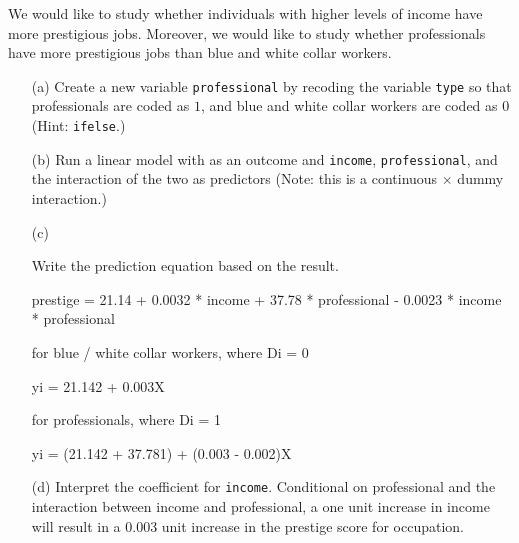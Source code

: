 \documentclass[12pt,letterpaper]{article}
\begin{document}
\noindent We would like to study whether individuals with higher levels of income have more prestigious jobs. Moreover, we would like to study whether professionals have more prestigious jobs than blue and white collar workers.
\vspace{.5cm}
\begin{enumerate}
	
	\item [(a)]
	Create a new variable \texttt{professional} by recoding the variable \texttt{type} so that professionals are coded as $1$, and blue and white collar workers are coded as $0$ (Hint: \texttt{ifelse}.)
	
	  
	
	\vspace{.5cm}
	
	
	\item [(b)]
	Run a linear model with  as an outcome and \texttt{income}, \texttt{professional}, and the interaction of the two as predictors (Note: this is a continuous $\times$ dummy interaction.)
	
	  
	
	\vspace{.5cm}
	\item [(c)]
	
	Write the prediction equation based on the result.
	
	\vspace{.1cm}
	prestige = 21.14 + 0.0032 * income + 37.78 * professional - 0.0023 * income * professional
	
	\vspace{.1cm}
	for blue / white collar workers, where Di = 0
	
	\vspace{.1cm}
	yi = 21.142 + 0.003X
	
	\vspace{.1cm}
	for professionals, where Di = 1
	
	\vspace{.1cm}
	yi = (21.142 + 37.781) + (0.003 - 0.002)X
	
	
\vspace{.5cm}
	\item [(d)]
	Interpret the coefficient for \texttt{income}.
	\vspace{.1cm}
	Conditional on professional and the interaction between income and professional, a one unit increase in income will result in a 0.003 unit increase in the prestige score for occupation.
	

\end{enumerate}
\end{document}
